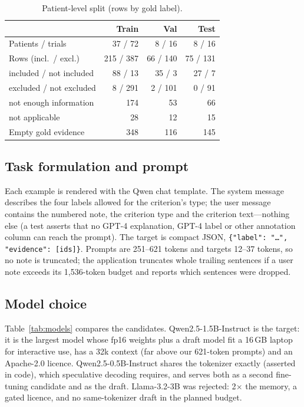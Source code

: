 \documentclass[conference]{IEEEtran}
\begin{document}
\begin{table}[t]
\centering
\caption{Patient-level split (rows by gold label).}
\label{tab:split}
\begin{tabular}{lrrr}
\toprule
 & Train & Val & Test \\
\midrule
Patients / trials & 37 / 72 & 8 / 16 & 8 / 16 \\
Rows (incl.\ / excl.) & 215 / 387 & 66 / 140 & 75 / 131 \\
included / not included & 88 / 13 & 35 / 3 & 27 / 7 \\
excluded / not excluded & 8 / 291 & 2 / 101 & 0 / 91 \\
not enough information & 174 & 53 & 66 \\
not applicable & 28 & 12 & 15 \\
Empty gold evidence & 348 & 116 & 145 \\
\bottomrule
\end{tabular}
\end{table}

\subsection{Task formulation and prompt}
Each example is rendered with the Qwen chat template. The system message describes the four labels allowed for the criterion's type; the user message contains the numbered note, the criterion type and the criterion text---nothing else (a test asserts that no GPT-4 explanation, GPT-4 label or other annotation column can reach the prompt). The target is compact JSON, \texttt{\{"label": "\ldots", "evidence": [ids]\}}. Prompts are 251--621 tokens and targets 12--37 tokens, so no note is truncated; the application truncates whole trailing sentences if a user note exceeds its 1{,}536-token budget and reports which sentences were dropped.

\subsection{Model choice}
Table~\ref{tab:models} compares the candidates. Qwen2.5-1.5B-Instruct is the target: it is the largest model whose fp16 weights plus a draft model fit a 16\,GB laptop for interactive use, has a 32k context (far above our 621-token prompts) and an Apache-2.0 licence. Qwen2.5-0.5B-Instruct shares the tokenizer exactly (asserted in code), which speculative decoding requires, and serves both as a second fine-tuning candidate and as the draft. Llama-3.2-3B was rejected: 2$\times$ the memory, a gated licence, and no same-tokenizer draft in the planned budget.
\end{document}
